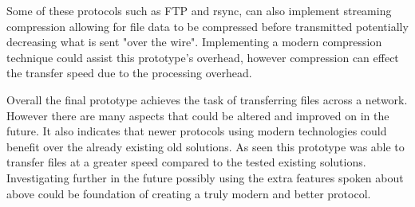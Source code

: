 Some of these protocols such as FTP and rsync, can also implement streaming compression allowing for file data to be compressed before transmitted potentially decreasing what is sent "over the wire". Implementing a modern compression technique could assist this prototype's overhead, however compression can effect the transfer speed due to the processing overhead.

Overall the final prototype achieves the task of transferring files across a network. However there are many aspects that could be altered and improved on in the future. It also indicates that newer protocols using modern technologies could benefit over the already existing old solutions. As seen this prototype was able to transfer files at a greater speed compared to the tested existing solutions. Investigating further in the future possibly using the extra features spoken about above could be foundation of creating a truly modern and better protocol.

